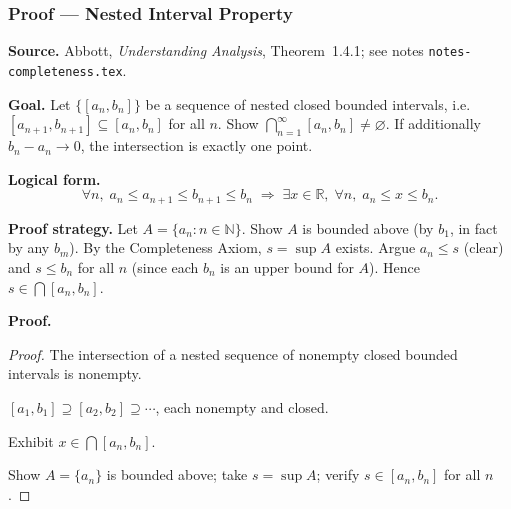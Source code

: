
\clearpage
{}
\hypertarget{proof-RA-ABB-P-nested-interval}{}

\subsubsection[Nested Interval Property]{Proof --- Nested Interval Property}

\bigskip

\noindent
\textbf{Source.}
Abbott, \emph{Understanding Analysis}, Theorem~1.4.1; see notes
\texttt{notes-completeness.tex}.

\vspace{0.75em}

\noindent
\textbf{Goal.}
Let $\{[a_n, b_n]\}$ be a sequence of nested closed bounded intervals,
i.e.\ $[a_{n+1}, b_{n+1}] \subseteq [a_n, b_n]$ for all $n$.
Show $\bigcap_{n=1}^{\infty} [a_n, b_n] \neq \varnothing$.
If additionally $b_n - a_n \to 0$, the intersection is exactly one point.

\vspace{0.75em}

\noindent
\textbf{Logical form.}
\[
  \forall n,\; a_n \le a_{n+1} \le b_{n+1} \le b_n
  \;\Rightarrow\;
  \exists x \in \mathbb{R},\; \forall n,\; a_n \le x \le b_n.
\]

\vspace{0.75em}

\noindent
\textbf{Proof strategy.}
Let $A = \{a_n : n \in \mathbb{N}\}$. Show $A$ is bounded above (by $b_1$,
in fact by any $b_m$). By the Completeness Axiom, $s = \sup A$ exists.
Argue $a_n \le s$ (clear) and $s \le b_n$ for all $n$ (since each $b_n$
is an upper bound for $A$). Hence $s \in \bigcap [a_n, b_n]$.

\vspace{0.75em}

\noindent
\textbf{Proof.}
\begin{proof}
\Claim The intersection of a nested sequence of nonempty closed bounded
intervals is nonempty.

\Given $[a_1, b_1] \supseteq [a_2, b_2] \supseteq \cdots$, each nonempty
and closed.

\Goal Exhibit $x \in \bigcap [a_n, b_n]$.

\Strategy Show $A = \{a_n\}$ is bounded above; take $s = \sup A$; verify
$s \in [a_n, b_n]$ for all $n$.

\medskip





\medskip

\end{proof}

